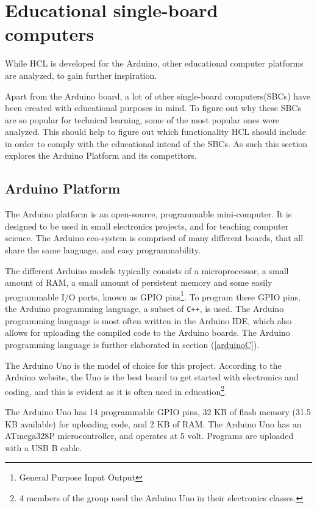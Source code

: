 \iffalse
\section{Educational single-board computers}
While HCL is developed for the Arduino, other educational computer platforms are analyzed, to gain further inspiration.

Apart from the Arduino board, a lot of other single-board computers(SBCs) have been created with educational purposes in mind.
To figure out why these SBCs are so popular for technical learning, some of the most popular ones were analyzed.
This should help to figure out which functionality HCL should include in order to comply with the educational intend of the SBCs\cite{SBC}.
As such this section explores the Arduino Platform and its competitors.

\subsection{Arduino Platform}
The Arduino platform is an open-source, programmable mini-computer\cite{ArFAQ}.
It is designed to be used in small electronics projects, and for teaching computer science.
The Arduino eco-system is comprised of many different boards, that all share the same language, and easy programmability.

The different Arduino models typically consists of a microprocessor, a small amount of RAM, a small amount of persistent memory and some easily programmable I/O ports, known as GPIO pins\footnote{General Purpose Input Output}.
To program these GPIO pins, the Arduino programming language, a subset of \texttt{C++}, is used.
The Arduino programming language is most often written in the Arduino IDE, which also allows for uploading the compiled code to the Arduino boards.
The Arduino programming language is further elaborated in section (\ref{arduinoC}).

The Arduino Uno is the model of choice for this project.
According to the Arduino website, the Uno is the best board to get started with electronics and coding, and this is evident as it is often used in education\footnote{4 members of the group used the Arduino Uno in their electronics classes.}\cite{ArduinoUno}.

The Arduino Uno has 14 programmable GPIO pins, 32 KB of flash memory (31.5 KB available) for uploading code, and 2 KB of RAM.
The Arduino Uno has an ATmega328P microcontroller, and operates at 5 volt.
Programs are uploaded with a USB B cable.

